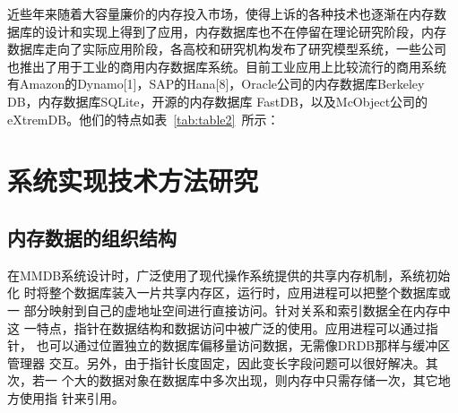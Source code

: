 \documentclass[literaturereview]{zjutreport}
\begin{document}
近些年来随着大容量廉价的内存投入市场，使得上诉的各种技术也逐渐在内存数
据库的设计和实现上得到了应用，内存数据库也不在停留在理论研究阶段，内存
数据库走向了实际应用阶段，各高校和研究机构发布了研究模型系统，一些公司
也推出了用于工业的商用内存数据库系统。目前工业应用上比较流行的商用系统
有Amazon的Dynamo[1]，SAP的Hana[8]，Oracle公司的内存数据库Berkeley DB，内存数据库SQLite，开源的内存数据库
FastDB，以及McObject公司的eXtremDB。他们的特点如表~\ref{tab:table2}~所示：

\begin{table}[htbp]
\caption{主流内存数据库}\label{tab:table2}
\vspace{\baselineskip}
\end{table}

\chapter{系统实现技术方法研究}
\section{内存数据的组织结构}
在MMDB系统设计时，广泛使用了现代操作系统提供的共享内存机制，系统初始化
时将整个数据库装入一片共享内存区，运行时，应用进程可以把整个数据库或一
部分映射到自己的虚地址空间进行直接访问。针对关系和索引数据全在内存中这
一特点，指针在数据结构和数据访问中被广泛的使用。应用进程可以通过指针，
也可以通过位置独立的数据库偏移量访问数据，无需像DRDB那样与缓冲区管理器
交互。另外，由于指针长度固定，因此变长字段问题可以很好解决。其次，若一
个大的数据对象在数据库中多次出现，则内存中只需存储一次，其它地方使用指
针来引用。
\end{document}
